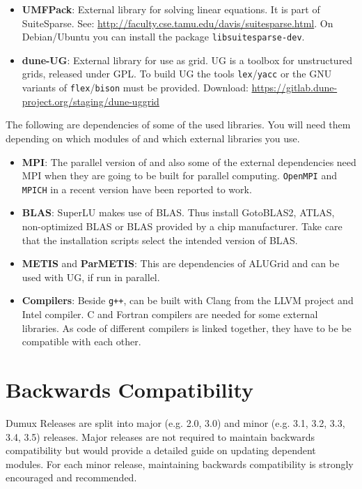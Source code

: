 \begin{itemize}
\item \textbf{UMFPack}: External library for solving linear equations. It is part of SuiteSparse.
  See: \url{http://faculty.cse.tamu.edu/davis/suitesparse.html}. On Debian/Ubuntu you can install the package \texttt{libsuitesparse-dev}.

\item \textbf{dune-UG}: External library for use as grid. UG is a toolbox for unstructured grids, released under GPL.
  To build UG the tools \texttt{lex}/\texttt{yacc} or the GNU variants of \texttt{flex}/\texttt{bison} must be provided.
  Download: \url{https://gitlab.dune-project.org/staging/dune-uggrid}
\end{itemize}

The following are dependencies of some of the used libraries. You will need them
depending on which modules of \Dune and which external libraries you use.

\begin{itemize}
\item \textbf{MPI}: The parallel version of \Dune and also some of the external dependencies need MPI
  when they are going to be built for parallel computing. \texttt{OpenMPI} and \texttt{MPICH} in a recent
  version have been reported to work.

\item \textbf{BLAS}: SuperLU makes use of BLAS. Thus install GotoBLAS2, ATLAS, non-optimized BLAS
  or BLAS provided by a chip manufacturer. Take care that the installation scripts select the intended
  version of BLAS.

\item \textbf{METIS} and \textbf{ParMETIS}: This are dependencies of ALUGrid and can be used with UG, if run in parallel.

\item \textbf{Compilers}: Beside \texttt{g++}, \Dune can be built with Clang from the LLVM project and
  Intel \Cplusplus compiler. C and Fortran compilers are needed for some external libraries. As code of
  different compilers is linked together, they have to be be compatible with each other.
\end{itemize}

\section{Backwards Compatibility}
\label{sec:backwardscompatibility}

Dumux Releases are split into major (e.g. 2.0, 3.0) and minor (e.g. 3.1, 3.2, 3.3, 3.4, 3.5) releases.
Major releases are not required to maintain backwards compatibility 
but would provide a detailed guide on updating dependent modules.
For each minor release, maintaining backwards compatibility is strongly encouraged and recommended.

